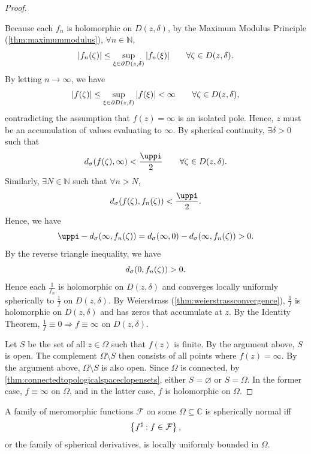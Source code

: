 \begin{proof}
\begin{enumerate}
            Because each \(f_n\) is holomorphic on \(D(z,\delta)\), by the Maximum Modulus Principle (\cref{thm:maximummodulus}), \(\forall n\in\mathbb{N}\), \[\abs{f_n(\zeta)}\leq\sup_{\xi\in\partial D(z,\delta)}\abs{f_n(\xi)}\qquad\forall\zeta\in D(z,\delta).\]
            By letting \(n\to\infty\), we have \[\abs{f(\zeta)}\leq\sup_{\xi\in\partial D(z,\delta)}\abs{f(\xi)}<\infty\qquad\forall\zeta\in D(z,\delta),\] contradicting the assumption that \(f(z)=\infty\) is an isolated pole. Hence, \(z\) must be an accumulation of values evaluating to \(\infty\). By spherical continuity, \(\exists\delta>0\) such that \[d_\sigma\qty(f(\zeta),\infty)<\frac\uppi2\qquad\forall\zeta\in D(z,\delta).\] Similarly, \(\exists N\in\mathbb{N}\) such that \(\forall n>N\), \[d_\sigma\qty(f(\zeta),f_n(\zeta))<\frac\uppi2.\]
            Hence, we have \[\uppi-d_\sigma\qty(\infty,f_n(\zeta))=d_\sigma(\infty,0)-d_\sigma\qty(\infty,f_n(\zeta))>0.\] By the reverse triangle inequality, we have \[d_\sigma\qty(0,f_n(\zeta))>0.\]
            Hence each \(\frac{1}{f_n}\) is holomorphic on \(D(z,\delta)\) and converges locally uniformly spherically to \(\frac{1}{f}\) on \(D(z,\delta)\). By Weierstrass (\cref{thm:weierstrassconvergence}), \(\frac1f\) is holomorphic on \(D(z,\delta)\) and has zeros that accumulate at \(z\). By the Identity Theorem, \(\frac1f\equiv0\Rightarrow f\equiv\infty\) on \(D(z,\delta)\).
    \end{enumerate}
    Let \(S\) be the set of all \(z\in\Omega\) such that \(f(z)\) is finite. By the argument above, \(S\) is open. The complement \(\Omega\setminus S\) then consists of all points where \(f(z)=\infty\). By the argument above, \(\Omega\setminus S\) is also open. Since \(\Omega\) is connected, by \cref{thm:connectedtopologicalspaceclopensets}, either \(S=\varnothing\) or \(S=\Omega\). In the former case, \(f\equiv\infty\) on \(\Omega\), and in the latter case, \(f\) is holomorphic on \(\Omega\).
\end{proof}
\begin{theorem}\label{thm:marty}
    A family of meromorphic functions \(\mathcal{F}\) on some \(\Omega\subseteq\mathbb{C}\) is spherically normal iff \[\cbraces{f^\sharp}{f\in\mathcal{F}},\] or the family of spherical derivatives, is locally uniformly bounded in \(\Omega\).
\end{theorem}
